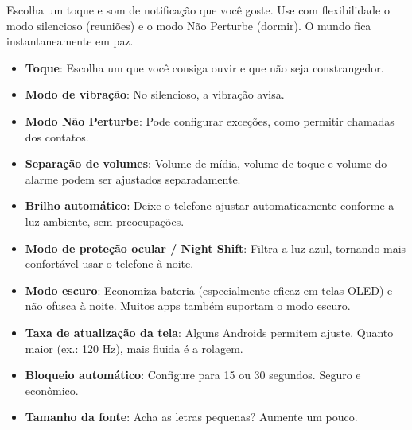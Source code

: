 


Escolha um toque e som de notificação que você goste. Use com flexibilidade o modo silencioso (reuniões) e o modo Não Perturbe (dormir). O mundo fica instantaneamente em paz.

\begin{itemize}
  \item \textbf{Toque}: Escolha um que você consiga ouvir e que não seja constrangedor.
  \item \textbf{Modo de vibração}: No silencioso, a vibração avisa.
  \item \textbf{Modo Não Perturbe}: Pode configurar exceções, como permitir chamadas dos contatos.
  \item \textbf{Separação de volumes}: Volume de mídia, volume de toque e volume do alarme podem ser ajustados separadamente.
\end{itemize}


\begin{itemize}
  \item \textbf{Brilho automático}: Deixe o telefone ajustar automaticamente conforme a luz ambiente, sem preocupações.
  \item \textbf{Modo de proteção ocular / Night Shift}: Filtra a luz azul, tornando mais confortável usar o telefone à noite.
  \item \textbf{Modo escuro}: Economiza bateria (especialmente eficaz em telas OLED) e não ofusca à noite. Muitos apps também suportam o modo escuro.
  \item \textbf{Taxa de atualização da tela}: Alguns Androids permitem ajuste. Quanto maior (ex.: 120 Hz), mais fluida é a rolagem.
  \item \textbf{Bloqueio automático}: Configure para 15 ou 30 segundos. Seguro e econômico.
  \item \textbf{Tamanho da fonte}: Acha as letras pequenas? Aumente um pouco.
\end{itemize}


